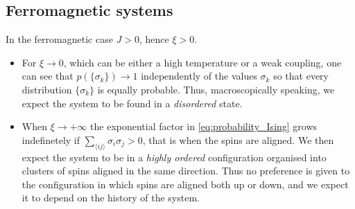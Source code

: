 \subsection{Ferromagnetic systems}
\label{subsec:ferromagnetic}
In the ferromagnetic case $J > 0$, hence $\xi > 0$. 
\begin{itemize}
    \item For $\xi \to 0$, which can be either a high temperature or a weak coupling, one can see that 
    $p(\{\sigma_k\}) \to 1$ independently of the values $\sigma_k$ so that every distribution $\{\sigma_k\}$ is equally probable.
    Thus, macroscopically speaking, we expect the system to be found in a \emph{disordered} state.
    \item When $\xi \to +\infty$ the exponential factor in \ref{eq:probability_Ising} grows indefinetely if $\sum_{\langle i j\rangle}\sigma_{i} \sigma_{j} > 0$, that is when the spins are aligned.
    We then expect the system to be in a \emph{highly ordered} configuration organised into clusters of spins aligned in the same direction.
    Thus no preference is given to the configuration in which spins are aligned both up or down, and we expect it to depend on the history of the system. \\
\end{itemize}
